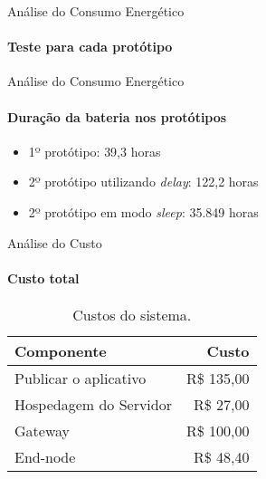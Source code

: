 \begin{frame}{Análise do Consumo Energético}
  \framesubtitle{Teste para cada protótipo}
\end{frame}

\begin{frame}{Análise do Consumo Energético}
  \framesubtitle{Duração da bateria nos protótipos}
  \begin{itemize}
    \item 1º protótipo: \alert{39,3 horas}
    \item 2º protótipo utilizando \textit{delay}: \alert{122,2 horas}
    \item 2º protótipo em modo \textit{sleep}: \alert{35.849 horas}
  \end{itemize}
\end{frame}

\begin{frame}{Análise do Custo}
  \framesubtitle{Custo total}
  \begin{table}[!b]{
    \scalebox{0.9} {
      \carlitoTLF
      \begin{tabularx}{\textwidth}{Xr}
        \textbf{Componente} & \textbf{Custo} \\
        \toprule
        Publicar o aplicativo & R\$ 135,00 \\
        Hospedagem do Servidor & R\$ 27,00 \\
        Gateway & R\$ 100,00 \\
        End-node & R\$ 48,40 \\
        \bottomrule
      \end{tabularx}
    }
  }
    \caption{Custos do sistema.}
  \end{table}
\end{frame}